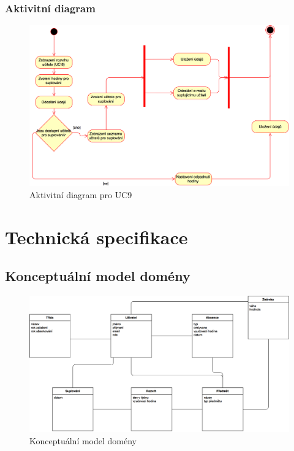 \documentclass[a4paper,10pt,titlepage]{article}
\begin{document}
	\subsubsection*{Aktivitní diagram}
		\begin{figure}[H]
			\centering
					\includegraphics[width=\textwidth]{vis_uc9_activity}
			\caption{Aktivitní diagram pro UC9}
		\end{figure}
	\vspace{5mm}
	
	\section{Technická specifikace}
	\subsection{Konceptuální model domény}
		\begin{figure}[H]
			\centering
					\includegraphics[width=\textwidth]{vis_conceptual_domain_model}
			\caption{Konceptuální model domény}
		\end{figure}
			
\end{document}
